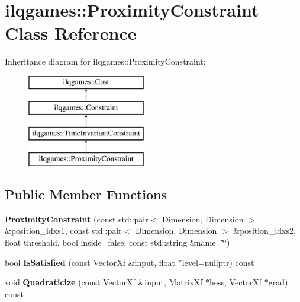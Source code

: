 \hypertarget{classilqgames_1_1_proximity_constraint}{}\section{ilqgames\+:\+:Proximity\+Constraint Class Reference}
\label{classilqgames_1_1_proximity_constraint}
Inheritance diagram for ilqgames\+:\+:Proximity\+Constraint\+:\begin{figure}[H]
\begin{center}
\leavevmode
\includegraphics[height=4.000000cm]{classilqgames_1_1_proximity_constraint}
\end{center}
\end{figure}
\subsection*{Public Member Functions}
\begin{DoxyCompactItemize}
\item 
{\bfseries Proximity\+Constraint} (const std\+::pair$<$ Dimension, Dimension $>$ \&position\+\_\+idxs1, const std\+::pair$<$ Dimension, Dimension $>$ \&position\+\_\+idxs2, float threshold, bool inside=false, const std\+::string \&name=\char`\"{}\char`\"{})\hypertarget{classilqgames_1_1_proximity_constraint_a71159362756836048f230751764f1caa}{}\label{classilqgames_1_1_proximity_constraint_a71159362756836048f230751764f1caa}

\item 
bool {\bfseries Is\+Satisfied} (const Vector\+Xf \&input, float $\ast$level=nullptr) const \hypertarget{classilqgames_1_1_proximity_constraint_a0f7dd2dad20ab131cb565c04a4d60d3d}{}\label{classilqgames_1_1_proximity_constraint_a0f7dd2dad20ab131cb565c04a4d60d3d}

\item 
void {\bfseries Quadraticize} (const Vector\+Xf \&input, Matrix\+Xf $\ast$hess, Vector\+Xf $\ast$grad) const \hypertarget{classilqgames_1_1_proximity_constraint_a8b9e59164c2be71572124872af9b7b79}{}\label{classilqgames_1_1_proximity_constraint_a8b9e59164c2be71572124872af9b7b79}

\end{DoxyCompactItemize}
